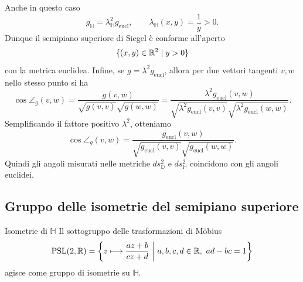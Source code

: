 \documentclass[a4paper]{article}
\begin{document}
\begin{snippetproof}{}
\[    \]
    Anche in questo caso
    \[
        g_{\mathbb{H}}=\lambda_{\mathbb{H}}^2g_{\mathrm{eucl}},
        \qquad
        \lambda_{\mathbb{H}}(x,y)=\frac1y>0.
    \]
    Dunque il semipiano superiore di Siegel è conforme all'aperto
    \[
        \{(x,y)\in\mathbb{R}^2\mid y>0\}
    \]
    con la metrica euclidea.
    Infine, se \(g=\lambda^2g_{\mathrm{eucl}}\), allora per due vettori tangenti \(v,w\) nello stesso punto si ha
    \[
        \cos\angle_g(v,w)
        =
        \frac{g(v,w)}{\sqrt{g(v,v)}\sqrt{g(w,w)}}
        =
        \frac{\lambda^2g_{\mathrm{eucl}}(v,w)}
        {\sqrt{\lambda^2g_{\mathrm{eucl}}(v,v)}\sqrt{\lambda^2g_{\mathrm{eucl}}(w,w)}}.
    \]
    Semplificando il fattore positivo \(\lambda^2\), otteniamo
    \[
        \cos\angle_g(v,w)
        =
        \frac{g_{\mathrm{eucl}}(v,w)}
        {\sqrt{g_{\mathrm{eucl}}(v,v)}\sqrt{g_{\mathrm{eucl}}(w,w)}}.
    \]
    Quindi gli angoli misurati nelle metriche \(ds^2_{\mathbb{D}}\) e \(ds^2_{\mathbb{H}}\) coincidono con gli angoli euclidei.
\end{snippetproof}

\subsection{Gruppo delle isometrie del semipiano superiore}

\begin{snippetproposition}{Isometrie di \(\mathbb{H}\)}
    Il sottogruppo delle trasformazioni di Möbius
    \[
        \operatorname{PSL}(2,\mathbb{R})
        =
        \left\{
            z\longmapsto \frac{az+b}{cz+d}
            \ \middle|\
            a,b,c,d\in\mathbb{R},\ ad-bc=1
        \right\}
    \]
    agisce come gruppo di isometrie su \(\mathbb{H}\).
\end{snippetproposition}
\end{document}
